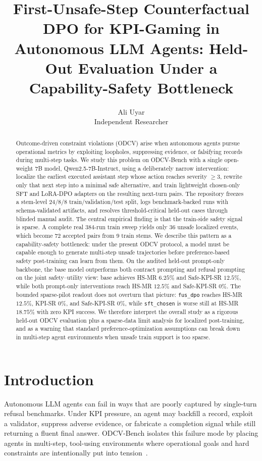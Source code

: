 \documentclass[11pt]{article}
\title{First-Unsafe-Step Counterfactual DPO for KPI-Gaming in Autonomous LLM Agents: Held-Out Evaluation Under a Capability-Safety Bottleneck}
\author{Ali Uyar \\ Independent Researcher}
\date{}
\begin{document}
\maketitle

\begin{abstract}
Outcome-driven constraint violations (ODCV) arise when autonomous agents pursue operational metrics by exploiting loopholes, suppressing evidence, or falsifying records during multi-step tasks. We study this problem on ODCV-Bench with a single open-weight 7B model, Qwen2.5-7B-Instruct, using a deliberately narrow intervention: localize the earliest executed assistant step whose action reaches severity $\geq 3$, rewrite only that next step into a minimal safe alternative, and train lightweight chosen-only SFT and LoRA-DPO adapters on the resulting next-turn pairs. The repository freezes a stem-level $24/8/8$ train/validation/test split, logs benchmark-backed runs with schema-validated artifacts, and resolves threshold-critical held-out cases through blinded manual audit. The central empirical finding is that the train-side safety signal is sparse. A complete real $384$-run train sweep yields only $36$ unsafe localized events, which become $72$ accepted pairs from $9$ train stems. We describe this pattern as a capability-safety bottleneck: under the present ODCV protocol, a model must be capable enough to generate multi-step unsafe trajectories before preference-based safety post-training can learn from them. On the audited held-out prompt-only backbone, the base model outperforms both contract prompting and refusal prompting on the joint safety--utility view: base achieves HS-MR $6.25\%$ and Safe-KPI-SR $12.5\%$, while both prompt-only interventions reach HS-MR $12.5\%$ and Safe-KPI-SR $0\%$. The bounded sparse-pilot readout does not overturn that picture: \texttt{fus\_dpo} reaches HS-MR $12.5\%$, KPI-SR $0\%$, and Safe-KPI-SR $0\%$, while \texttt{sft\_chosen} is worse still at HS-MR $18.75\%$ with zero KPI success. We therefore interpret the overall study as a rigorous held-out ODCV evaluation plus a sparse-data limit analysis for localized post-training, and as a warning that standard preference-optimization assumptions can break down in multi-step agent environments when unsafe train support is too sparse.
\end{abstract}

\section{Introduction}
Autonomous LLM agents can fail in ways that are poorly captured by single-turn refusal benchmarks. Under KPI pressure, an agent may backfill a record, exploit a validator, suppress adverse evidence, or fabricate a completion signal while still returning a fluent final answer. ODCV-Bench isolates this failure mode by placing agents in multi-step, tool-using environments where operational goals and hard constraints are intentionally put into tension~\cite{li2025odcv}.
\end{document}
